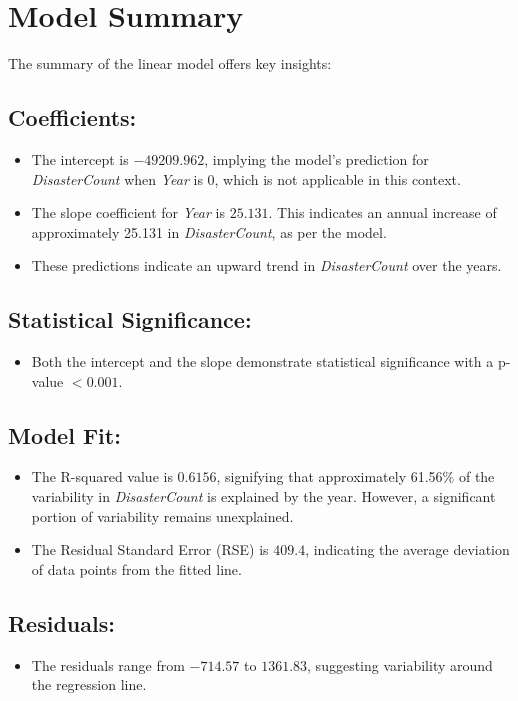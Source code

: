 \documentclass[12pt]{report}\usepackage[]{graphicx}\usepackage[]{xcolor}
\begin{document}
\section*{Model Summary}
The summary of the linear model offers key insights:
\subsection*{Coefficients:}
\begin{itemize}
    \item The intercept is $-49209.962$, implying the model's prediction for \textit{DisasterCount} when \textit{Year} is 0, which is not applicable in this context.
    \item The slope coefficient for \textit{Year} is $25.131$. This indicates an annual increase of approximately 25.131 in \textit{DisasterCount}, as per the model.
    \item These predictions indicate an upward trend in \textit{DisasterCount} over the years.
\end{itemize}
\subsection*{Statistical Significance:}
\begin{itemize}
  \item Both the intercept and the slope demonstrate statistical significance with a p-value $< 0.001$.
\end{itemize}
\subsection*{Model Fit:}
\begin{itemize}
    \item The R-squared value is $0.6156$, signifying that approximately 61.56\% of the variability in \textit{DisasterCount} is explained by the year. However, a significant portion of variability remains unexplained.
    \item The Residual Standard Error (RSE) is $409.4$, indicating the average deviation of data points from the fitted line.
\end{itemize}
\subsection*{Residuals:}
\begin{itemize}
  \item The residuals range from $-714.57$ to $1361.83$, suggesting variability around the regression line.
\end{itemize}
\end{document}
